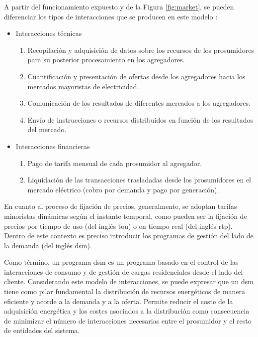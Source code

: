\vspace{3mm}

A partir del funcionamiento expuesto y de la Figura \ref{fig:market}, se pueden diferenciar los tipos de interacciones que se producen en este modelo \cite{business}:

\begin{itemize}
  \item Interacciones técnicas 
    \begin{enumerate}
      \item Recopilación y adquisición de datos sobre los recursos de los prosumidores para su posterior procesamiento en los agregadores.  
      \item Cuantificación y presentación de ofertas desde los agregadores hacia los mercados mayoristas de electricidad.
      \item Comunicación de los resultados de diferentes mercados a los agregadores.
      \item Envío de instrucciones o recursos distribuidos en función de los resultados del mercado.      
    \end{enumerate}

  \item Interacciones financieras
  \begin{enumerate}
    \item Pago de tarifa mensual de cada prosumidor al agregador.
    \item Liquidación de las transacciones trasladadas desde los prosumidores en el mercado eléctrico (cobro por demanda y pago por generación).    
  \end{enumerate}
\end{itemize}

\vspace{1mm}

En cuanto al proceso de fijación de precios, generalmente, se adoptan tarifas minoristas dinámicas según el instante temporal, como pueden ser la fijación de precios por tiempo de uso (del inglés \gls{tou}) o en tiempo real (del inglés \gls{rtp}). Dentro de este contexto es preciso introducir los programas de gestión del lado de la demanda (del inglés \gls{dsm}). 

\vspace{3mm}

Como término, un programa \gls{dsm} es un programa basado en el control de las interacciones de consumo y de gestión de cargas residenciales desde el lado del cliente. Considerando este modelo de interacciones, se puede expresar que un \gls{dsm} tiene como pilar fundamental la distribución de recursos energéticos de manera eficiente y acorde a la demanda y a la oferta. Permite reducir el coste de la adquisición energética y los costes asociados a la distribución como consecuencia de minimizar el número de interacciones necesarias entre el prosumidor y el resto de entidades del sistema. \cite{dsm}

